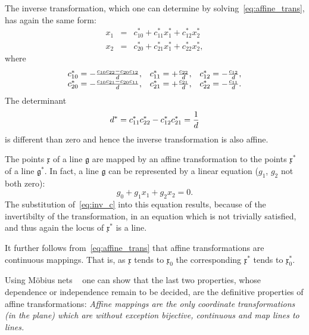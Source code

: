 \documentclass[11pt]{book} \usepackage{amssymb}
\newcommand{\myvec}[1]{\mathfrak{#1}}
\newcommand{\vecx}{\myvec{x}}
\begin{document}
The inverse transformation, which one can determine by 
solving~\eqref{eq:affine_trans}, has again the same form: 
\begin{equation}
  \label{eq:affine_trans_inv}
  \begin{array}{rcl}
    x_1 &=& c_{10}^*+c_{11}^*x_1^*+c_{12}^*x_2^*\\
    x_2 &=& c_{20}^*+c_{21}^*x_1^*+c_{22}^*x_2^*,
  \end{array}
\end{equation}
where
\begin{equation}
  \label{eq:inv_c}
  \begin{array}{lll}
    c_{10}^*=-{c_{10}c_{22}-c_{20}c_{12} \over d},& c_{11}^*=+{c_{22}\over d},&c_{12}^*=-{c_{12}\over d},\\
    c_{20}^*=-{c_{10}c_{21}-c_{20}c_{11} \over d},& c_{21}^*=+{c_{21}\over d},&c_{22}^*=-{c_{11}\over d}.
  \end{array}
\end{equation}
The determinant
\begin{equation}
  \label{eq:inv_det}
  d^*=c_{11}^*c_{22}^*-c_{12}^*c_{21}^*={1\over d}
\end{equation}
is different than zero and hence the inverse transformation is also affine.

The points $\vecx$ of a line $\mathfrak{g}$ are mapped by an affine 
transformation to
the points $\vecx^*$ of a line $\mathfrak{g}^*$. In fact, a line 
$\mathfrak{g}$ can be
represented by a linear equation ($g_1$, $g_2$ not both zero):
\begin{equation}
  \label{eq:line}
  g_0+g_1x_1+g_2x_2=0.
\end{equation}
The substitution of~\eqref{eq:inv_c} into this equation results, because of the
invertibilty of the transformation, in an equation which is not trivially
satisfied, and thus again the locus of $\vecx^*$ is a line.

It further follows from~\eqref{eq:affine_trans} that affine transformations are
continuous mappings. That is, as $\vecx$ tends to $\vecx_0$ the 
corresponding $\vecx^*$ tends to $\vecx^*_0$.

Using M\"obius nets ~\cite{Mobius:1827} one can show that the last
two properties, whose dependence or independence remain to be decided, are
the definitive properties of affine transformations: {\em Affine mappings are
the only coordinate transformations (in the plane) which are without
exception bijective, continuous and map lines to lines.}
\end{document}
